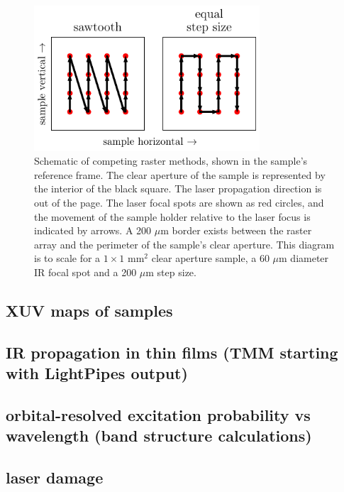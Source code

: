 \begin{figure}
	\centering
	\includegraphics[width=0.75\textwidth]{figures/chap4/rastering_methods.pdf}
	\caption{Schematic of competing raster methods, shown in the sample's reference frame. The clear aperture of the sample is represented by the interior of the black square. The laser propagation direction is out of the page. The laser focal spots are shown as red circles, and the movement of the sample holder relative to the laser focus is indicated by arrows. A 200 $\mu$m border exists between the raster array and the perimeter of the sample's clear aperture. This diagram is to scale for a $1\times1$ mm$^2$ clear aperture sample, a 60 $\mu$m diameter IR focal spot and a 200 $\mu$m step size.}
	\label{fig:Rastering_Methods}
\end{figure}

\subsection{XUV maps of samples}

\subsection{IR propagation in thin films (TMM starting with LightPipes output)}

\subsection{orbital-resolved excitation probability vs wavelength (band structure calculations)}

\subsection{laser damage}

